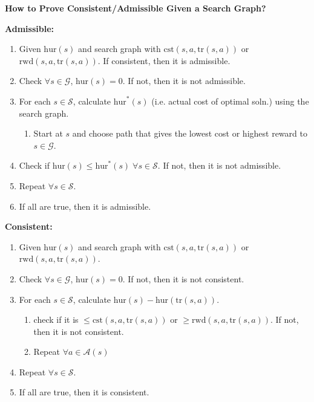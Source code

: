 \begin{example} 
    
\end{example}
\newpage

\begin{process} \textbf{How to Prove Consistent/Admissible Given a Search Graph?}
   
    \textbf{Admissible:}
    \begin{enumerate}
        \item Given $\text{hur}(s)$ and search graph with $\text{cst}(s,a,\text{tr}(s,a))$ or $\text{rwd}(s,a,\text{tr}(s,a))$. If consistent, then it is admissible.
        \item Check $\forall s \in \mathcal{G}$, $\text{hur}(s) = 0$. If not, then it is not admissible.
        \item For each $s \in \mathcal{S}$, calculate $\text{hur}^*(s)$ (i.e. actual cost of optimal soln.) using the search graph.
        \begin{enumerate}
            \item Start at $s$ and choose path that gives the lowest cost or highest reward to $s \in \mathcal{G}$. 
        \end{enumerate}
        \item Check if $\text{hur}(s) \leq \text{hur}^*(s) \; \forall s \in \mathcal{S}$. If not, then it is not admissible.
        \item Repeat $\forall s \in \mathcal{S}$. 
        \item If all are true, then it is admissible.
    \end{enumerate}
    \vspace{1em}

    \textbf{Consistent:}
    \begin{enumerate}
        \item Given $\text{hur}(s)$ and search graph with $\text{cst}(s,a,\text{tr}(s,a))$ or $\text{rwd}(s,a,\text{tr}(s,a))$. 
        \item Check $\forall s \in \mathcal{G}$, $\text{hur}(s) = 0$. If not, then it is not consistent.
        \item For each $s \in \mathcal{S}$, calculate $\text{hur}(s) - \text{hur}(\text{tr}(s, a))$.
        \begin{enumerate}
            \item check if it is $\leq \text{cst}(s,a,\text{tr}(s,a))$ or $\geq \text{rwd}(s,a,\text{tr}(s,a))$. If not, then it is not consistent.
            \item Repeat $\forall a \in \mathcal{A}(s)$
        \end{enumerate}
        \item Repeat $\forall s \in \mathcal{S}$.
        \item If all are true, then it is consistent.
    \end{enumerate}
\end{process}


